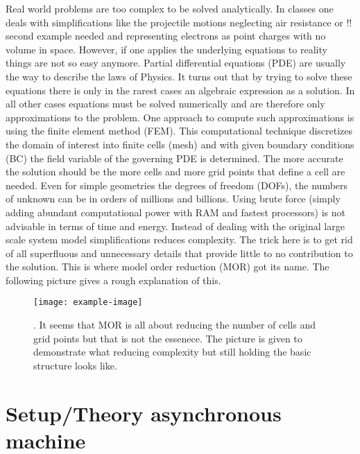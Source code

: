 \documentclass{scrartcl}
\begin{document}
Real world problems are too complex to be solved analytically. In classes one deals with simplifications like the projectile motions neglecting air resistance or \alert{!! second example needed} and representing electrons as point charges with no volume in space. However, if one applies the underlying equations to reality things are not so easy anymore. Partial differential equations (PDE) are usually the way to describe the laws of Physics. It turns out that by trying to solve these equations there is only in the rarest cases an algebraic expression as a solution. In all other cases equations must be solved numerically and are therefore only approximations to the problem. One approach to compute such approximations is using the finite element method (FEM). This computational technique discretizes the domain of interest into finite cells (mesh) and with given boundary conditions (BC) the field variable of the governing PDE is determined. The more accurate the solution should be the more cells and more grid points that define a cell are needed. Even for simple geometries the degrees of freedom (DOFs), \ie{} the numbers of unknown can be in orders of millions and billions. Using brute force (simply adding abundant computational power with RAM and fastest processors) is not advisable in terms of time and energy. Instead of dealing with the original large scale system model simplifications reduces complexity. The trick here is to get rid of all superfluous and unnecessary details that provide little to no contribution to the solution. This is where model order reduction (MOR) got its name. The following picture gives a rough explanation of this.
\begin{figure}[H]
	\texttt{[image: example-image]}
	\caption{\cite[2]{benner2021model}. It seems that MOR is all about reducing the number of cells and grid points but that is not the essenece. The picture is given to demonstrate what reducing complexity but still holding the basic structure looks like.}
	\label{}
\end{figure}


\section{Setup/Theory asynchronous machine}
\cite[p722]{sahdev2017electrical}
\cite[p263]{wildi2006elect7rical}
\end{document}
